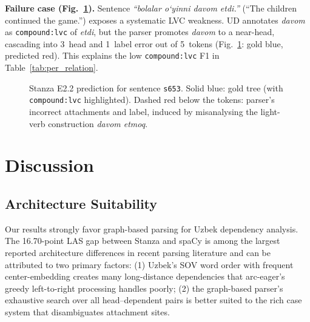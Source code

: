 \documentclass[10pt,conference,a4paper]{IEEEtran_EDM}
\begin{document}
\textbf{Failure case (Fig.~\ref{fig:parse_failure}).} Sentence \textit{``bolalar o\textquoteleft{}yinni davom etdi.''} (``The children continued the game.'') exposes a systematic LVC weakness. UD annotates \textit{davom} as \texttt{compound:lvc} of \textit{etdi}, but the parser promotes \textit{davom} to a near-head, cascading into 3~head and 1~label error out of 5~tokens (Fig.~\ref{fig:parse_failure}: gold blue, predicted red). This explains the low \texttt{compound:lvc} F1 in Table~\ref{tab:per_relation}.

\begin{figure}[htbp]
\centering
{}
\caption{Stanza E2.2 prediction for sentence \texttt{s653}. Solid blue: gold tree (with \texttt{compound:lvc} highlighted). Dashed red below the tokens: parser's incorrect attachments and label, induced by misanalysing the light-verb construction \textit{davom etmoq}.}
\label{fig:parse_failure}
\end{figure}

\section{Discussion}

\subsection{Architecture Suitability}

Our results strongly favor graph-based parsing for Uzbek dependency analysis. The 16.70-point LAS gap between Stanza and spaCy is among the largest reported architecture differences in recent parsing literature and can be attributed to two primary factors: (1) Uzbek's SOV word order with frequent center-embedding creates many long-distance dependencies that arc-eager's greedy left-to-right processing handles poorly; (2) the graph-based parser's exhaustive search over all head--dependent pairs is better suited to the rich case system that disambiguates attachment sites.
\end{document}
